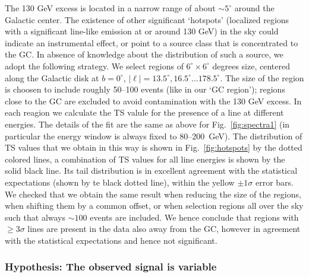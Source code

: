 \documentclass[aps,twocolumn,prd,superscriptaddress,showpacs,nofootinbib,fixfloat]{revtex4}
\begin{document}
The 130 GeV excess is located in a narrow range of about $\sim5^\circ$ around
the Galactic center. The existence of other significant `hotspots' (localized
regions with a significant line-like emission at or around 130 GeV) in the sky
could indicate an instrumental effect, or point to a source class that is
concentrated to the GC. In absence of knowledge about the distribution of such
a source, we adopt the following strategy. We select regions of
$6^\circ\times6^\circ$ degrees size, centered along the Galactic disk at
$b=0^\circ$, $|\ell|=13.5^\circ, 16.5^\circ \dots 178.5^\circ$. The size of
the region is choosen to include roughly 50--100 events (like in our `GC
region'); regions close to the GC are excluded to avoid contamination with the
130 GeV excess. In each reagion we calculate the TS valule for the presence of
a line at different energies. The details of the fit are the same as above for
Fig.~\ref{fig:spectra1} (in particular the energy window is always fixed to
80--200~GeV). The distribution of TS values that we obtain in this way is
shown in Fig.~\ref{fig:hotspots} by the dotted colored lines, a combination of
TS values for all line energies is shown by the solid black line. Its tail
distribution is in excellent agreement with the statistical expectations
(shown by te black dotted line), within the yellow $\pm1\sigma$ error bars. We
checked that we obtain the same result when reducing the size of the regions,
when shifting them by a common offset, or when selection regions all over the
sky such that always $\sim100$ events are included. We hence conclude that
regions with $\geq3\sigma$ lines are present in the data also away from the
GC, however in agreement with the statistical expectations and hence not
significant.

\subsubsection{Hypothesis: The observed signal is variable}
\end{document}
